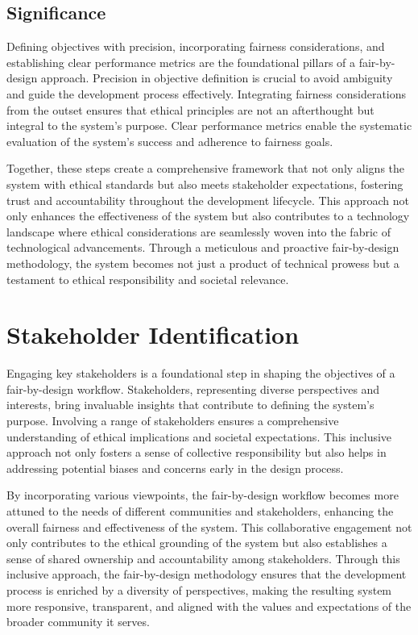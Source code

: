 \subsection{Significance}

Defining objectives with precision, incorporating fairness considerations, and establishing clear performance metrics are the foundational pillars of a fair-by-design approach. Precision in objective definition is crucial to avoid ambiguity and guide the development process effectively. Integrating fairness considerations from the outset ensures that ethical principles are not an afterthought but integral to the system's purpose. Clear performance metrics enable the systematic evaluation of the system's success and adherence to fairness goals.

Together, these steps create a comprehensive framework that not only aligns the system with ethical standards but also meets stakeholder expectations, fostering trust and accountability throughout the development lifecycle. This approach not only enhances the effectiveness of the system but also contributes to a technology landscape where ethical considerations are seamlessly woven into the fabric of technological advancements. Through a meticulous and proactive fair-by-design methodology, the system becomes not just a product of technical prowess but a testament to ethical responsibility and societal relevance.

\section{Stakeholder Identification}
\label{section:stakeholder-identification}

Engaging key stakeholders is a foundational step in shaping the objectives of a fair-by-design workflow. Stakeholders, representing diverse perspectives and interests, bring invaluable insights that contribute to defining the system's purpose. Involving a range of stakeholders ensures a comprehensive understanding of ethical implications and societal expectations. This inclusive approach not only fosters a sense of collective responsibility but also helps in addressing potential biases and concerns early in the design process.

By incorporating various viewpoints, the fair-by-design workflow becomes more attuned to the needs of different communities and stakeholders, enhancing the overall fairness and effectiveness of the system. This collaborative engagement not only contributes to the ethical grounding of the system but also establishes a sense of shared ownership and accountability among stakeholders. Through this inclusive approach, the fair-by-design methodology ensures that the development process is enriched by a diversity of perspectives, making the resulting system more responsive, transparent, and aligned with the values and expectations of the broader community it serves.

